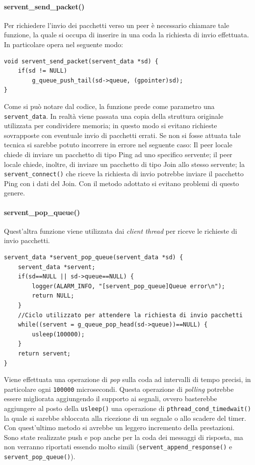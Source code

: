 \paragraph{servent\_send\_packet()}
Per richiedere l'invio dei pacchetti verso un peer è necessario chiamare tale funzione, la quale si occupa di inserire in una coda la richiesta di invio effettuata. In particolare opera nel seguente modo:
\begin{lstlisting}[frame=trBL]
void servent_send_packet(servent_data *sd) {
	if(sd != NULL) 
		g_queue_push_tail(sd->queue, (gpointer)sd);
}
\end{lstlisting}
Come si può notare dal codice, la funzione prede come parametro una \texttt{servent\_data}. In realtà viene passata una copia della struttura originale utilizzata per condividere memoria; in questo modo si evitano richieste sovrapposte con eventuale invio di pacchetti errati. Se non si fosse attuata tale tecnica si sarebbe potuto incorrere in errore nel seguente caso: Il peer locale chiede di inviare un pacchetto di tipo Ping ad uno specifico servente; il peer locale chiede, inoltre, di inviare un pacchetto di tipo Join allo stesso servente; la \texttt{servent\_connect()} che riceve la richiesta di invio potrebbe inviare il pacchetto Ping con i dati del Join. Con il metodo adottato si evitano problemi di questo genere.
\paragraph{servent\_pop\_queue()}
Quest'altra funzione viene utilizzata dai \textit{client thread} per riceve le richieste di invio pacchetti.
\begin{lstlisting}[frame=trBL]
servent_data *servent_pop_queue(servent_data *sd) {
	servent_data *servent;
	if(sd==NULL || sd->queue==NULL) {
		logger(ALARM_INFO, "[servent_pop_queue]Queue error\n");
		return NULL;
	}
	//Ciclo utilizzato per attendere la richiesta di invio pacchetti
	while((servent = g_queue_pop_head(sd->queue))==NULL) {
		usleep(100000);
	}
	return servent;
}
\end{lstlisting}
Viene effettuata una operazione di \textit{pop} sulla coda ad intervalli di tempo precisi, in particolare ogni \texttt{100000} microsecondi. Questa operazione di \textit{polling} potrebbe essere migliorata aggiungendo il supporto ai segnali, ovvero basterebbe aggiungere al posto della \texttt{usleep()} una operazione di \texttt{pthread\_cond\_timedwait()} la quale si sarebbe sbloccata alla ricezione di un segnale o allo scadere del timer. Con quest'ultimo metodo si avrebbe un leggero incremento della prestazioni. Sono state realizzate push e pop anche per la coda dei messaggi di risposta, ma non verranno riportati essendo molto simili (\texttt{servent\_append\_response()} e \texttt{servent\_pop\_queue()}).
